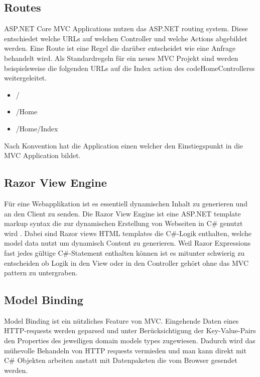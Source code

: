  
\subsection{Routes}

ASP.NET Core MVC Applications nutzen das ASP.NET routing system. Diese entschiedet welche URLs auf welchen Controller und welche Actions abgebildet werden. Eine Route ist eine Regel die darüber entscheidet wie eine Anfrage behandelt wird. Als Standardregeln für ein neues MVC Projekt sind werden beispielsweise die folgenden URLs auf die Index action des code{HomeControllers}s weitergeleitet.

\begin{itemize}

	\item /
	\item /Home
	\item /Home/Index

\end{itemize}

\noindent
Nach Konvention hat die Application einen  welcher den Einstiegspunkt in die MVC Application bildet.


\subsection{Razor View Engine}

Für eine Webapplikation ist es essentiell dynamischen Inhalt zu generieren und an den Client zu senden. Die Razor View Engine ist eine ASP.NET template markup syntax die zur dynamischen Erstellung von Webseiten in C\# genutzt wird \cite{razorengine}. Dabei sind Razor views HTML templates die C\#-Logik enthalten, welche model data nutzt um dynamisch Content zu generieren. Weil Razor Expressions fast jedes gültige C\#-Statement enthalten können ist es mitunter schwierig zu entscheiden ob Logik in den View oder in den Controller gehört ohne das MVC pattern zu untergraben.

\subsection{Model Binding}

Model Binding ist ein nützliches Feature von MVC. Eingehende Daten eines HTTP-requests werden geparsed und unter Berücksichtigung der Key-Value-Pairs den Properties des jeweiligen domain models types zugewiesen. Dadurch wird das mühevolle Behandeln von HTTP requests vermieden und man kann direkt mit C\# Objekten arbeiten anstatt mit Datenpaketen die vom Browser gesendet werden.

